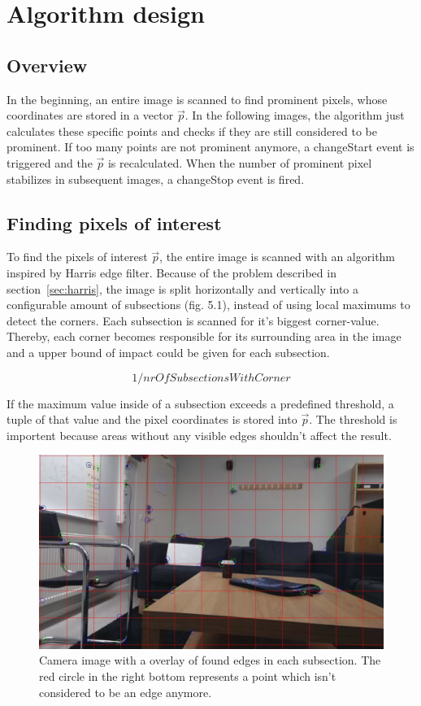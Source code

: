 \chapter{Algorithm design}

\section{Overview}
In the beginning, an entire image is scanned to find prominent pixels, whose coordinates are stored in a vector $\vec{p}$. In the following images, the algorithm just calculates these specific points and checks if they are still considered to be prominent. If too many points are not prominent anymore, a changeStart event is triggered and the $\vec{p}$ is recalculated. When the number of prominent pixel stabilizes in subsequent images, a changeStop event is fired.

\section{Finding pixels of interest}
To find the pixels of interest $\vec{p}$, the entire image is scanned with an algorithm inspired by Harris edge filter. Because of the problem described in section~\ref{sec:harris}, the image is split horizontally and vertically into a configurable amount of subsections  (fig. 5.1), instead of using local maximums to detect the corners. Each subsection is scanned for it's biggest corner-value. Thereby, each corner becomes responsible for its surrounding area in the image and a upper bound of impact could be given for each subsection. 

$$ 1 / nrOfSubsectionsWithCorner $$

If the maximum value inside of a subsection exceeds a predefined threshold, a tuple of that value and the pixel coordinates is stored into $\vec{p}$. The threshold is importent because areas without any visible edges shouldn't affect the result.

\begin{figure}[h!]
	\centering
	\includegraphics[width=0.9\linewidth]{bin/hotspots}
	\caption{Camera image with a overlay of found edges in each subsection. The red circle in the right bottom represents a point which isn't considered to be an edge anymore. }
	\label{fig:hotspots}
\end{figure} 

